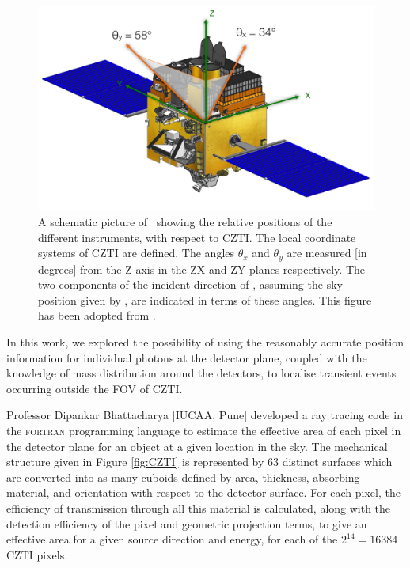 \begin{figure}
\begin{center}
\includegraphics[scale=0.33]{GRB151006A--AstroSat}
\caption[Schematic diagram of the \s\ position of \grb\ with respect to local CZTI co-ordinates]{A schematic picture of \AS\ showing the relative positions of the different instruments, with respect to CZTI. The local coordinate systems of CZTI are defined. The angles $\theta_x$ and $\theta_y$ are measured [in degrees] from the Z-axis in the ZX and ZY planes respectively. The two components of the incident direction of \grb, assuming the sky-position given by \s, are indicated in terms of these angles. This figure has been adopted from \cite{Rao_et_al.-2016-ApJ}.}
\label{fig:GRB151006A--Swift_position}
\end{center}
\end{figure}


In this work, we explored the possibility of using the reasonably accurate position information for individual photons at the detector plane, coupled with the knowledge of mass distribution around the detectors, to localise transient events occurring outside the FOV of CZTI.

Professor Dipankar Bhattacharya [IUCAA, Pune] developed a ray tracing code in the \textsc{fortran} programming language to estimate the effective area of each pixel in the detector plane for an object at a given location in the sky. The mechanical structure given in Figure \ref{fig:CZTI} is represented by $63$ distinct surfaces which are converted into as many cuboids defined by area, thickness, absorbing material, and orientation with respect to the detector surface. For each pixel, the efficiency of transmission through all this material is calculated, along with the detection efficiency of the pixel and geometric projection terms, to give an effective area for a given source direction and energy, for each of the $2^{14} = 16384$ CZTI pixels.

